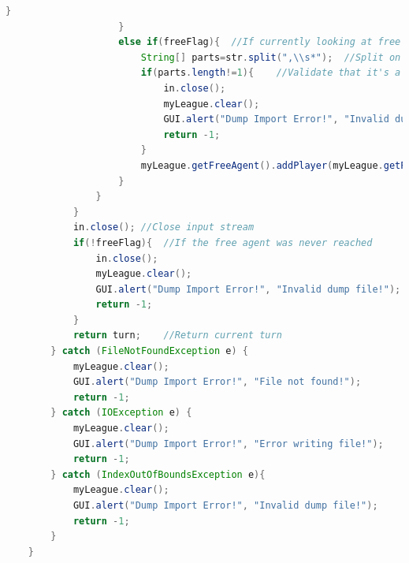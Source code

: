 \documentclass[12pt]{report}
\begin{document}
\begin{singlespace}
\begin{lstlisting}[language=Java,label=some-code,caption={IOManager.java}]
						}
					}
					else if(freeFlag){	//If currently looking at free agent
						String[] parts=str.split(",\\s*");	//Split on commas
						if(parts.length!=1){	//Validate that it's a player name
							in.close();
							myLeague.clear();
							GUI.alert("Dump Import Error!", "Invalid dump file!");
							return -1;
						}
						myLeague.getFreeAgent().addPlayer(myLeague.getPlayer(parts[0].trim()));	//Get reference to player and add player to free agent
					}
				}
			}
			in.close();	//Close input stream
			if(!freeFlag){	//If the free agent was never reached
				in.close();
				myLeague.clear();
				GUI.alert("Dump Import Error!", "Invalid dump file!");
				return -1;
			}
			return turn;	//Return current turn
		} catch (FileNotFoundException e) {
			myLeague.clear();
			GUI.alert("Dump Import Error!", "File not found!");
			return -1;
		} catch (IOException e) {
			myLeague.clear();
			GUI.alert("Dump Import Error!", "Error writing file!");
			return -1;
		} catch (IndexOutOfBoundsException e){
			myLeague.clear();
			GUI.alert("Dump Import Error!", "Invalid dump file!");
			return -1;
		}
	}
	

\end{lstlisting}
\end{singlespace}
\end{document}
